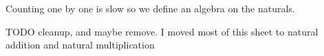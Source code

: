 
\sbasic











\sstart
{}


Counting one by one is slow so we define
an algebra on the naturals.

TODO cleanup, and maybe remove. I moved most of this
sheet to natural addition and natural multiplication



\strats

